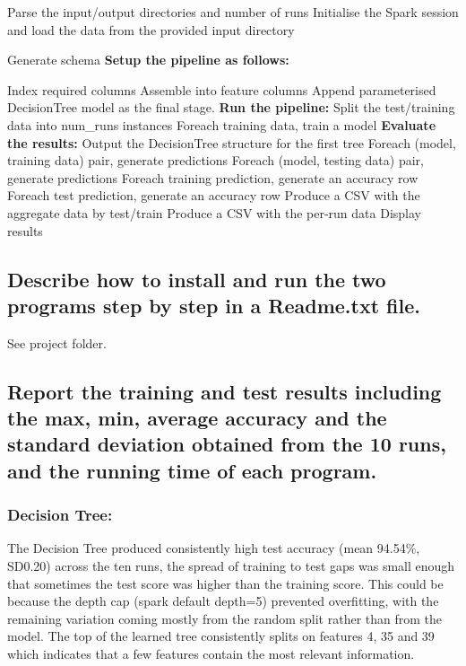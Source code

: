 \documentclass[12pt]{article}
\begin{document}
\begin{algorithm}
\caption{Spark Decision Tree}
\begin{algorithmic}[1]

\State Parse the input/output directories and number of runs
\State Initialise the Spark session and load the data from the provided input directory

\Statex Generate schema
\Statex \textbf{Setup the pipeline as follows:}

\State Index required columns
\State Assemble into feature columns
\State Append parameterised DecisionTree model as the final stage.
\Statex \textbf{Run the pipeline:}
\State Split the test/training data into num\_runs instances
\State Foreach training data, train a model
\Statex \textbf{Evaluate the results:}
\State Output the DecisionTree structure for the first tree
\State Foreach (model, training data) pair, generate predictions
\State Foreach (model, testing data) pair, generate predictions
\State Foreach training prediction, generate an accuracy row
\State Foreach test prediction, generate an accuracy row
\State Produce a CSV with the aggregate data by test/train
\State Produce a CSV with the per-run data
\State Display results

\end{algorithmic}
\end{algorithm}

\FloatBarrier

\subsection{Describe how to install and run the two programs step by
step in a Readme.txt file.}

See project folder.

\subsection{Report the training and test results including the max, min,
average accuracy and the standard deviation obtained from the 10 runs,
and the running time of each program.}

\subsubsection{Decision Tree:}

The Decision Tree produced consistently high test accuracy (mean 94.54\%, SD0.20) across the ten runs, the spread of training to test gaps was small enough that sometimes the test score was higher than the training score. This could be because the depth cap (spark default depth=5) prevented overfitting, with the remaining variation coming mostly from the random split rather than from the model. The top of the learned tree consistently splits on features 4, 35 and 39 which indicates that a few features contain the most relevant information. 
\end{document}
